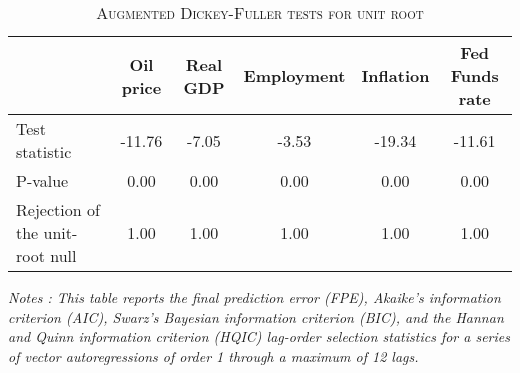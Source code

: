 \begin{table}[H] 
 \centering 
\begin{threeparttable} 
\caption{\textsc{Augmented Dickey-Fuller tests for unit root}} \label{tab:DF} 
\begin{tabular*}{1 \textwidth }{lccccc} 
 \toprule \toprule  
  & Oil price & Real GDP & Employment & Inflation & Fed Funds rate \tabularnewline \midrule Test statistic                  &   -11.76 &    -7.05 &    -3.53 &   -19.34 &   -11.61 \\ 
 P-value                         &     0.00 &     0.00 &     0.00 &     0.00 &     0.00 \\ 
 Rejection of the unit-root null &     1.00 &     1.00 &     1.00 &     1.00 &     1.00 \\ 
 \bottomrule \bottomrule 
 \end{tabular*} 
\begin{tablenotes} 
\small 
\item \emph{ \footnotesize{ Notes : This table reports the final prediction error (FPE), Akaike's information criterion (AIC), Swarz's Bayesian information criterion (BIC), and the Hannan and Quinn information criterion (HQIC) lag-order selection statistics for a series of vector autoregressions of order 1 through a maximum of 12 lags.  } } 
\end{tablenotes} 
\end{threeparttable} 
\end{table} 

